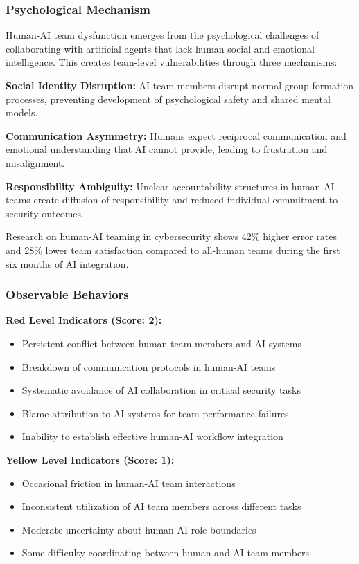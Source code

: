 \documentclass[11pt,a4paper]{article}
\begin{document}
\subsubsection{Psychological Mechanism}

Human-AI team dysfunction emerges from the psychological challenges of collaborating with artificial agents that lack human social and emotional intelligence. This creates team-level vulnerabilities through three mechanisms:

\textbf{Social Identity Disruption:} AI team members disrupt normal group formation processes, preventing development of psychological safety and shared mental models\cite{identity2024}.

\textbf{Communication Asymmetry:} Humans expect reciprocal communication and emotional understanding that AI cannot provide, leading to frustration and misalignment\cite{communication2023}.

\textbf{Responsibility Ambiguity:} Unclear accountability structures in human-AI teams create diffusion of responsibility and reduced individual commitment to security outcomes\cite{responsibility2024}.

Research on human-AI teaming in cybersecurity shows 42\% higher error rates and 28\% lower team satisfaction compared to all-human teams during the first six months of AI integration\cite{teaming2024}.

\subsubsection{Observable Behaviors}

\textbf{Red Level Indicators (Score: 2):}
\begin{itemize}
\item Persistent conflict between human team members and AI systems
\item Breakdown of communication protocols in human-AI teams
\item Systematic avoidance of AI collaboration in critical security tasks
\item Blame attribution to AI systems for team performance failures
\item Inability to establish effective human-AI workflow integration
\end{itemize}

\textbf{Yellow Level Indicators (Score: 1):}
\begin{itemize}
\item Occasional friction in human-AI team interactions
\item Inconsistent utilization of AI team members across different tasks
\item Moderate uncertainty about human-AI role boundaries
\item Some difficulty coordinating between human and AI team members
\end{itemize}
\end{document}
